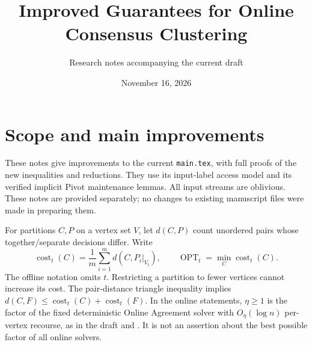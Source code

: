\documentclass[11pt]{article}
\title{Improved Guarantees for Online Consensus Clustering}
\author{Research notes accompanying the current draft}
\date{November 16, 2026}
\begin{document}
\maketitle

\section{Scope and main improvements}

These notes give improvements to the current \texttt{main.tex}, with
full proofs of the new inequalities and reductions. They use its
input-label access model and its verified implicit Pivot maintenance
lemmas. All input streams are oblivious. These notes are provided
separately; no changes to existing manuscript files were made in
preparing them.

For partitions $C,P$ on a vertex set $V$, let $d(C,P)$ count unordered
pairs whose together/separate decisions differ. Write
\[
 \operatorname{cost}_t(C)=\frac1m\sum_{i=1}^m d(C,P_i|_{V_t}),
 \qquad \operatorname{OPT}_t=\min_C\operatorname{cost}_t(C).
\]
The offline notation omits $t$. Restricting a partition to fewer vertices
cannot increase its cost. The pair-distance triangle inequality implies
$d(C,F)\le\operatorname{cost}_t(C)+\operatorname{cost}_t(F)$.
In the online statements, $\eta\ge1$ is the factor of the fixed
deterministic Online Agreement solver with $O_\eta(\log n)$ per-vertex
recourse, as in the draft and \cite{online}. It is not an assertion
about the best possible factor of all online solvers.
\end{document}
